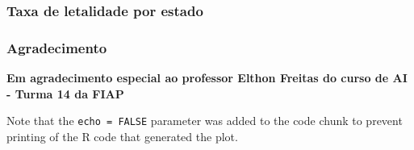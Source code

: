\documentclass[
]{article}
\newenvironment{Shaded}{\begin{snugshade}}{\end{snugshade}}
\newcommand{\DataTypeTok}[1]{\textcolor[rgb]{0.13,0.29,0.53}{#1}}
\newcommand{\KeywordTok}[1]{\textcolor[rgb]{0.13,0.29,0.53}{\textbf{#1}}}
\newcommand{\NormalTok}[1]{#1}
\newcommand{\OperatorTok}[1]{\textcolor[rgb]{0.81,0.36,0.00}{\textbf{#1}}}
\newcommand{\StringTok}[1]{\textcolor[rgb]{0.31,0.60,0.02}{#1}}
\begin{document}
\begin{Shaded}
\end{Shaded}

\hypertarget{htmlwidget-6c7320f4871635fe8b3a}{}
\begin{plotly}

\end{plotly}

\hypertarget{taxa-de-letalidade-por-estado}{%
\subsubsection{Taxa de letalidade por
estado}\label{taxa-de-letalidade-por-estado}}

\begin{Shaded}
\end{Shaded}

\hypertarget{htmlwidget-4183f47c3e97352c7e32}{}
\begin{plotly}

\end{plotly}

\hypertarget{agradecimento}{%
\subsubsection{Agradecimento}\label{agradecimento}}

\textbf{Em agradecimento especial ao professor Elthon Freitas do curso
de AI - Turma 14 da FIAP }

Note that the \texttt{echo\ =\ FALSE} parameter was added to the code
chunk to prevent printing of the R code that generated the plot.
\end{document}
